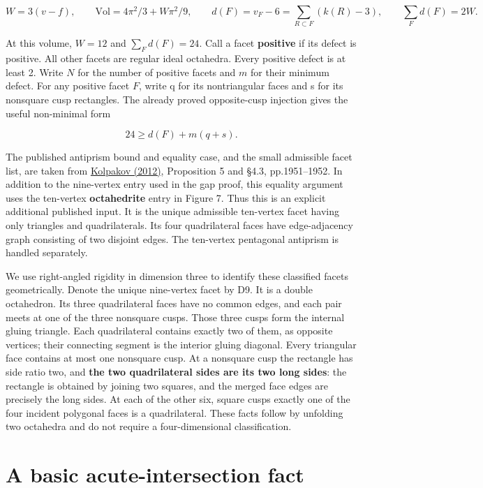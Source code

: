 \documentclass[11pt]{article}
\begin{document}
\[
 W=3(v-f),\qquad \mathrm{Vol}=4\pi^2/3+W\pi^2/9,
 \qquad d(F)=v_F-6=\sum_{R\subset F}(k(R)-3),
 \qquad \sum_Fd(F)=2W.
\]

At this volume, \(W=12\) and \(\sum_Fd(F)=24\). Call a facet \textbf{positive} if its defect is positive. All other facets are regular ideal octahedra. Every positive defect is at least 2. Write \(N\) for the number of positive facets and \(m\) for their minimum defect. For any positive facet \(F\), write q for its nontriangular faces and s for its nonsquare cusp rectangles. The already proved opposite-cusp injection gives the useful non-minimal form

\[
 24\ge d(F)+m(q+s). \tag{1}
\]

The published antiprism bound and equality case, and the small admissible facet list, are taken from \href{https://msp.org/agt/2012/12-4/agt-v12-n4-p03-s.pdf}{Kolpakov (2012)}, Proposition 5 and §4.3, pp.1951--1952. In addition to the nine-vertex entry used in the gap proof, this equality argument uses the ten-vertex \textbf{octahedrite} entry in Figure 7. Thus this is an explicit additional published input. It is the unique admissible ten-vertex facet having only triangles and quadrilaterals. Its four quadrilateral faces have edge-adjacency graph consisting of two disjoint edges. The ten-vertex pentagonal antiprism is handled separately.

We use right-angled rigidity in dimension three to identify these classified facets geometrically. Denote the unique nine-vertex facet by D9. It is a double octahedron. Its three quadrilateral faces have no common edges, and each pair meets at one of the three nonsquare cusps. Those three cusps form the internal gluing triangle. Each quadrilateral contains exactly two of them, as opposite vertices; their connecting segment is the interior gluing diagonal. Every triangular face contains at most one nonsquare cusp. At a nonsquare cusp the rectangle has side ratio two, and \textbf{the two quadrilateral sides are its two long sides}: the rectangle is obtained by joining two squares, and the merged face edges are precisely the long sides. At each of the other six, square cusps exactly one of the four incident polygonal faces is a quadrilateral. These facts follow by unfolding two octahedra and do not require a four-dimensional classification.

\section{A basic acute-intersection fact}\label{a-basic-acute-intersection-fact}
\end{document}
